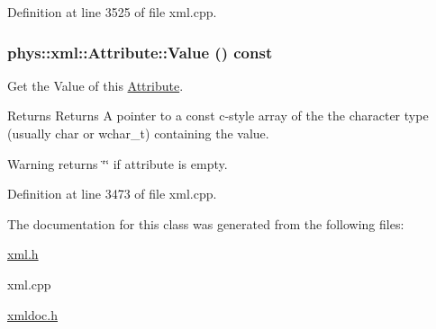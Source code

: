 Definition at line 3525 of file xml.cpp.

\hypertarget{classphys_1_1xml_1_1Attribute_a8a8099b39bca8894a8226ce0e82d3451}{
\subsubsection[{Value}]{\setlength{\rightskip}{0pt plus 5cm}phys::xml::Attribute::Value () const}}
\label{da/ddf/classphys_1_1xml_1_1Attribute_a8a8099b39bca8894a8226ce0e82d3451}


Get the Value of this \hyperlink{classphys_1_1xml_1_1Attribute}{Attribute}. 

\begin{DoxyReturn}{Returns}
Returns A pointer to a const c-\/style array of the the character type (usually char or wchar\_\-t) containing the value. 
\end{DoxyReturn}
\begin{DoxyWarning}{Warning}
returns \char`\"{}\char`\"{} if attribute is empty. 
\end{DoxyWarning}


Definition at line 3473 of file xml.cpp.



The documentation for this class was generated from the following files:\begin{DoxyCompactItemize}
\item 
\hyperlink{xml_8h}{xml.h}\item 
xml.cpp\item 
\hyperlink{xmldoc_8h}{xmldoc.h}\end{DoxyCompactItemize}
